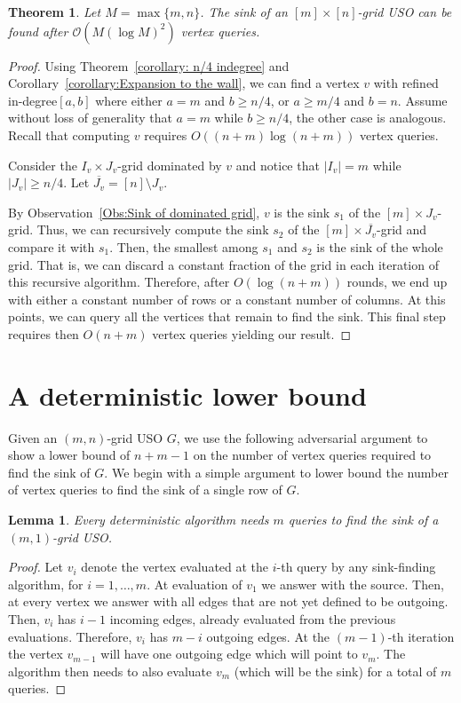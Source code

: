 \documentclass[a4paper,10pt]{article}
\newtheorem{lemma}{Lemma}
\newtheorem{theorem}{Theorem}
\newcommand{\indegree}{refined in-degree\xspace}
\begin{document}
\begin{theorem}\label{theorem:Sink algorithm}
 Let $M = \max\{m,n\}$. The sink of an $[m]\times[n]$-grid USO can be found after $\mathcal{O}(M(\log M)^2)$ vertex queries.
\end{theorem}
\begin{proof}
Using  Theorem~\ref{corollary: n/4 indegree} and Corollary~\ref{corollary:Expansion to the wall}, we can find a vertex $v$ with \indegree $[a,b]$ where either $a = m$ and $b \geq  n/4$, or $a \geq  m/4$ and $b  = n$. Assume without loss of generality that $a = m$ while $b\geq  n/4$, the other case is analogous. Recall that computing $v$ requires $O((n + m) \log (n+m))$ vertex queries.

Consider the $I_v\times J_v$-grid dominated by $v$ and 
notice that $|I_v| = m$ while $|J_v| \geq n/4$. Let $\overline{J_v} = [n]\setminus J_v$.

By Observation~\ref{Obs:Sink of dominated grid}, $v$ is the sink $s_1$ of the $[m] \times J_v$-grid. Thus, we can recursively compute the sink $s_2$ of the $[m]\times \overline{J_v}$-grid and compare it with $s_1$. Then, the smallest among $s_1$ and $s_2$ is the sink of the whole grid.
That is, we can discard a constant fraction of the grid in each iteration of this recursive algorithm. Therefore, after $O(\log (n + m))$ rounds, we end up with either a constant number of rows or a constant number of columns. At this points, we can query all the vertices that remain to find the sink. This final step requires then $O(n + m)$ vertex queries yielding our result.
\end{proof}

 
\section{A deterministic lower bound}

Given an $(m, n)$-grid USO $G$, we use the following adversarial argument to show a lower bound of $n + m -1$ on the number of vertex queries required to find the sink of $G$.
We begin with a simple argument to lower bound the number of vertex queries to find the sink of a single row of $G$.

\begin{lemma}\label{lem:kx1}
Every deterministic algorithm needs $m$ queries to find the sink of a $(m,1)$-grid USO. 
\end{lemma}
\begin{proof}
Let $v_i$ denote the vertex evaluated at the $i$-th query by any sink-finding algorithm, for $i=1,\ldots, m$. At evaluation of $v_1$ we answer with the source. Then, at every vertex 
we answer with all edges that are not yet defined to be outgoing. Then, $v_i$ has $i-1$ incoming edges, already evaluated from the previous evaluations. 
Therefore, $v_i$ has $m-i$ outgoing edges. At the $(m-1)$-th iteration the vertex $v_{m-1}$ will have one outgoing edge which will point to $v_m$.
The algorithm then needs to also evaluate $v_m$ (which will be the sink) for a total of $m$ queries. 
\end{proof}
\end{document}
